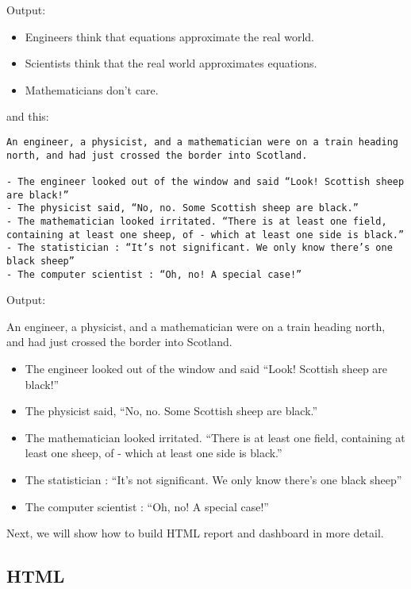\documentclass[
]{article}
\providecommand{\tightlist}{%
  \setlength{\itemsep}{0pt}\setlength{\parskip}{0pt}}
\begin{document}
Output:

\begin{itemize}
\tightlist
\item
  Engineers think that equations approximate the real world.
\item
  Scientists think that the real world approximates equations.
\item
  Mathematicians don't care.
\end{itemize}

and this:

\begin{verbatim}
An engineer, a physicist, and a mathematician were on a train heading north, and had just crossed the border into Scotland.

- The engineer looked out of the window and said “Look! Scottish sheep are black!”
- The physicist said, “No, no. Some Scottish sheep are black.”
- The mathematician looked irritated. “There is at least one field, containing at least one sheep, of - which at least one side is black.”
- The statistician : “It’s not significant. We only know there’s one black sheep”
- The computer scientist : “Oh, no! A special case!”
\end{verbatim}

Output:

An engineer, a physicist, and a mathematician were on a train heading
north, and had just crossed the border into Scotland.

\begin{itemize}
\tightlist
\item
  The engineer looked out of the window and said ``Look! Scottish sheep
  are black!''
\item
  The physicist said, ``No, no. Some Scottish sheep are black.''
\item
  The mathematician looked irritated. ``There is at least one field,
  containing at least one sheep, of - which at least one side is
  black.''
\item
  The statistician : ``It's not significant. We only know there's one
  black sheep''
\item
  The computer scientist : ``Oh, no! A special case!''
\end{itemize}

Next, we will show how to build HTML report and dashboard in more
detail.

\hypertarget{html}{%
\subsection{HTML}\label{html}}
\end{document}
